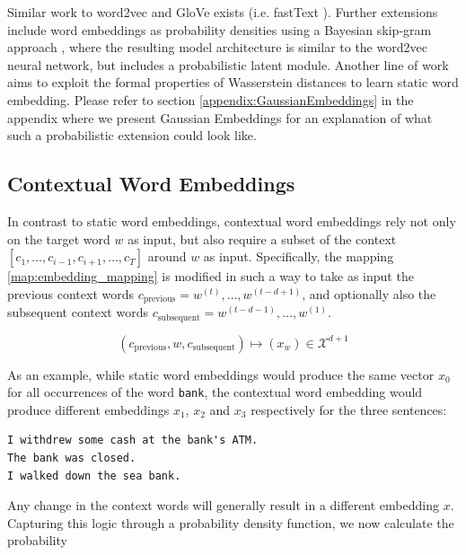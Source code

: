 \documentclass[a4paper,12pt,oneside,openright]{report}
\begin{document}
Similar work to word2vec and GloVe exists (i.e. fastText \cite{bojanowski17}).
Further extensions include word embeddings as probability densities using a Bayesian skip-gram approach \cite{brazinskas19}, where the resulting model architecture is similar to the word2vec neural network, but includes a probabilistic latent module.
Another line of work \cite{yan19} aims to exploit the formal properties of Wasserstein distances to learn static word embedding.
Please refer to section \ref{appendix:GaussianEmbeddings} in the appendix where we present Gaussian Embeddings \cite{vilnis14} for an explanation of what such a probabilistic extension could look like.

\subsection{Contextual Word Embeddings}

In contrast to static word embeddings, contextual word embeddings rely not only on the target word $w$ as input, but also require a subset of the context $[c_1, \ldots, c_{i-1}, c_{i+1}, \ldots, c_T]$ around $w$ as input.
Specifically, the mapping \eqref{map:embedding_mapping} is modified in such a way to take as input the previous context words $c_\text{previous} = w^{(t)}, \ldots, w^{(t-d + 1)}$, and optionally also the subsequent context words $c_\text{subsequent} = w^{(t-d - 1)}, \ldots, w^{(1)}$.

\begin{equation}
(c_\text{previous}, w, c_\text{subsequent}) \mapsto (x_w) \in \mathcal{X}^{d + 1}
\end{equation}{\label{map:context_embedding_mapping}}

As an example, while static word embeddings would produce the same vector $x_0$ for all occurrences of the word \texttt{bank}, the contextual word embedding would produce different embeddings $x_1$, $x_2$ and $x_3$ respectively for the three sentences:

\begin{tcolorbox}
\begin{verbatim}
I withdrew some cash at the bank's ATM.
The bank was closed.
I walked down the sea bank.
\end{verbatim}
\end{tcolorbox}

Any change in the context words will generally result in a different embedding $x$.
Capturing this logic through a probability density function, we now calculate the probability
\end{document}
